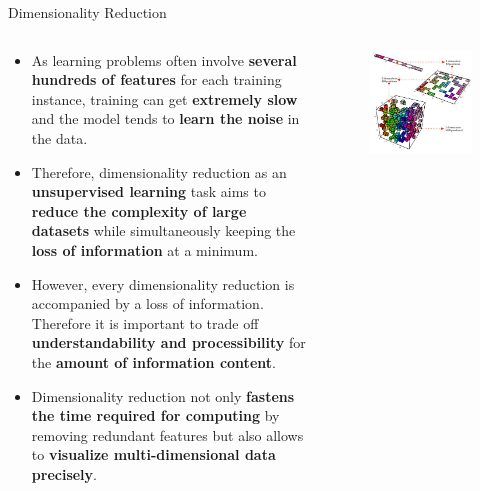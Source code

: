 \documentclass[document.tex]{subfiles}
\begin{document}
    \begin{frame}{Dimensionality Reduction}
        \begin{columns}
            \begin{column}{.6\textwidth}
                \begin{itemize}
                    \item As learning problems often involve \textbf{several hundreds of features} for each training instance, training can get \textbf{extremely slow} and the model tends to \textbf{learn the noise} in the data.
                    \item Therefore, dimensionality reduction as an \textbf{unsupervised learning} task aims to \textbf{reduce the complexity of large datasets} while simultaneously keeping the \textbf{loss of information} at a minimum.  
                    \item However, every dimensionality reduction is accompanied by a loss of information. Therefore it is important to trade off \textbf{understandability and processibility} for the \textbf{amount of information content}.
                    \item Dimensionality reduction not only \textbf{fastens the time required for computing} by removing redundant features but also allows to \textbf{visualize multi-dimensional data precisely}.
                \end{itemize}
            \end{column}
            \begin{column}{.4\textwidth}
                \begin{figure}
                    \label{fig:dimensionality-reduction-task}
                    \includegraphics[width=.8\textwidth, cframe=gray]{figures/external/dimensionality-reduction.png}
                \end{figure}
            \end{column}
        \end{columns}
    \end{frame}
\end{document}
